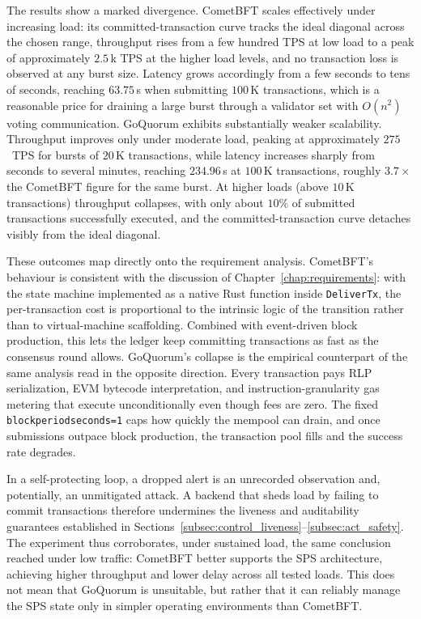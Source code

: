 The results show a marked divergence. CometBFT scales effectively under increasing load: its committed-transaction curve tracks the ideal diagonal across the chosen range, throughput rises from a few hundred TPS at low load to a peak of approximately $2.5$\,k TPS at the higher load levels, and no transaction loss is observed at any burst size. Latency grows accordingly from a few seconds to tens of seconds, reaching $63.75$\,s when submitting $100$\,K transactions, which is a reasonable price for draining a large burst through a validator set with $O(n^2)$ voting communication. GoQuorum exhibits substantially weaker scalability. Throughput improves only under moderate load, peaking at approximately $275$~TPS for bursts of $20$\,K transactions, while latency increases sharply from seconds to several minutes, reaching $234.96$\,s at $100$\,K transactions, roughly $3.7\times$ the CometBFT figure for the same burst. At higher loads (above $10$\,K transactions) throughput collapses, with only about $10\%$ of submitted transactions successfully executed, and the committed-transaction curve detaches visibly from the ideal diagonal.

These outcomes map directly onto the requirement analysis. CometBFT's behaviour is consistent with the discussion of Chapter~\ref{chap:requirements}: with the state machine implemented as a native Rust function inside \texttt{DeliverTx}, the per-transaction cost is proportional to the intrinsic logic of the transition rather than to virtual-machine scaffolding. Combined with event-driven block production, this lets the ledger keep committing transactions as fast as the consensus round allows. GoQuorum's collapse is the empirical counterpart of the same analysis read in the opposite direction. Every transaction pays RLP serialization, EVM bytecode interpretation, and instruction-granularity gas metering that execute unconditionally even though fees are zero. The fixed \texttt{blockperiodseconds=1} caps how quickly the mempool can drain, and once submissions outpace block production, the transaction pool fills and the success rate degrades.

In a self-protecting loop, a dropped alert is an unrecorded observation and, potentially, an unmitigated attack. A backend that sheds load by failing to commit transactions therefore undermines the liveness and auditability guarantees established in Sections~\ref{subsec:control_liveness}--\ref{subsec:act_safety}. The experiment thus corroborates, under sustained load, the same conclusion reached under low traffic: CometBFT better supports the SPS architecture, achieving higher throughput and lower delay across all tested loads. This does not mean that GoQuorum is unsuitable, but rather that it can reliably manage the SPS state only in simpler operating environments than CometBFT.

